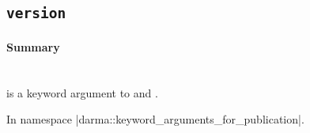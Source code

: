 \subsection{\texttt{version}}
\label{ssec:api_fe_version}

\paragraph{Summary}\mbox{}\\ 
 is a \gls{keyword argument} to  and
.  

In namespace |darma::keyword_arguments_for_publication|.

%
%
%
%



